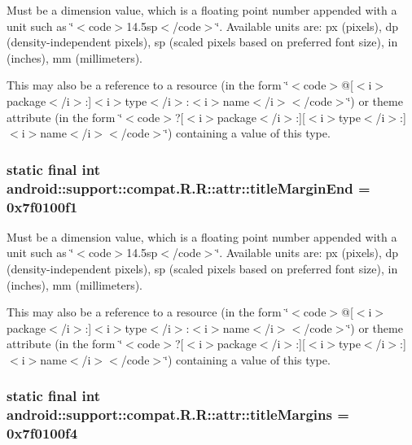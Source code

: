 Must be a dimension value, which is a floating point number appended with a unit such as \char`\"{}$<$code$>$14.5sp$<$/code$>$\char`\"{}. Available units are: px (pixels), dp (density-independent pixels), sp (scaled pixels based on preferred font size), in (inches), mm (millimeters). 

This may also be a reference to a resource (in the form \char`\"{}$<$code$>$@\mbox{[}$<$i$>$package$<$/i$>$:\mbox{]}$<$i$>$type$<$/i$>$:$<$i$>$name$<$/i$>$$<$/code$>$\char`\"{}) or theme attribute (in the form \char`\"{}$<$code$>$?\mbox{[}$<$i$>$package$<$/i$>$:\mbox{]}\mbox{[}$<$i$>$type$<$/i$>$:\mbox{]}$<$i$>$name$<$/i$>$$<$/code$>$\char`\"{}) containing a value of this type. \hypertarget{classandroid_1_1support_1_1compat_1_1_r_1_1attr_0c4ba2a00fb4dd1296e83fd72eb82397}{
\subsubsection[{titleMarginEnd}]{\setlength{\rightskip}{0pt plus 5cm}static final int android::support::compat.R.R::attr::titleMarginEnd = 0x7f0100f1}}
\label{classandroid_1_1support_1_1compat_1_1_r_1_1attr_0c4ba2a00fb4dd1296e83fd72eb82397}


Must be a dimension value, which is a floating point number appended with a unit such as \char`\"{}$<$code$>$14.5sp$<$/code$>$\char`\"{}. Available units are: px (pixels), dp (density-independent pixels), sp (scaled pixels based on preferred font size), in (inches), mm (millimeters). 

This may also be a reference to a resource (in the form \char`\"{}$<$code$>$@\mbox{[}$<$i$>$package$<$/i$>$:\mbox{]}$<$i$>$type$<$/i$>$:$<$i$>$name$<$/i$>$$<$/code$>$\char`\"{}) or theme attribute (in the form \char`\"{}$<$code$>$?\mbox{[}$<$i$>$package$<$/i$>$:\mbox{]}\mbox{[}$<$i$>$type$<$/i$>$:\mbox{]}$<$i$>$name$<$/i$>$$<$/code$>$\char`\"{}) containing a value of this type. \hypertarget{classandroid_1_1support_1_1compat_1_1_r_1_1attr_3cfb53d07cbba0ac4661241003a2389d}{
\subsubsection[{titleMargins}]{\setlength{\rightskip}{0pt plus 5cm}static final int android::support::compat.R.R::attr::titleMargins = 0x7f0100f4}}
\label{classandroid_1_1support_1_1compat_1_1_r_1_1attr_3cfb53d07cbba0ac4661241003a2389d}


